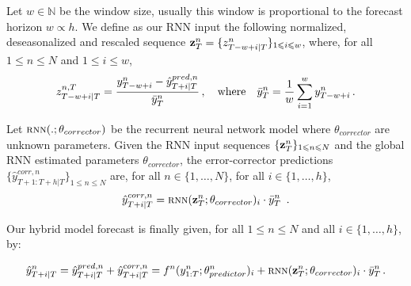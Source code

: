 \documentclass{article} %
\newcommand{\ts}{y}
\newcommand{\tspred}{\hat{\ts}}
\newcommand{\stat}{f}
\newcommand{\statparam}{\theta_{predictor}}
\newcommand{\lag}{h}
\newcommand{\window}{w}
\newcommand{\meants}{\Bar{\ts}}
\newcommand{\rnnwindow}{{\bf \rnninput}}
\newcommand{\rnninput}{z}
\newcommand{\rnn}{\textsc{rnn}}
\newcommand{\rnnparam}{\theta_{corrector}}
\begin{document}

Let $\window \in \mathbb{N}$ be the window size, usually this window is proportional to the forecast horizon $\window \propto \lag$. We define as our RNN input the following  normalized, deseasonalized and rescaled sequence $\rnnwindow^n_T = \{\rnninput^{n}_{T-\window+i|T}\}_{1\leqslant i \leqslant w}$, where, for all $1\leqslant n \leqslant N$ and $1\leqslant i \leqslant w$, 
$$
\rnninput^{n,T}_{T-w+i|T} = \frac{\ts^n_{T-w+i} -\tspred^{pred,n}_{T+i|T}}{\meants^n_T}\,,\quad\mbox{where}\quad \meants^n_T = \frac{1}{w}\sum_{i = 1}^{w}\ts^n_{T-w+i}\,.
$$


Let $\rnn(.;\rnnparam)$ be the recurrent neural network model where $\rnnparam$ are  unknown parameters. Given the RNN input sequences $\{\rnnwindow^n_T\}_{1\leqslant n \leqslant N}$ and the global RNN estimated parameters $\rnnparam$, the error-corrector predictions $\{\tspred^{corr,n}_{T+1:T+\lag|T}\}_{1\leqslant n \leqslant N}$ are, for all $n \in \{1,\ldots,N\}$, for all $i \in \{1,\ldots,\lag\}$,
$$
\tspred^{corr,n}_{T+i|T} = \rnn(\rnnwindow^n_T;\rnnparam)_i \cdot \meants^n_T\ \,.
$$

Our hybrid model forecast is finally given, for all $1\leqslant n \leqslant N$ and all $i \in \{1,\ldots,\lag\}$, by:

\begin{equation}
\label{eq:nows:full:model}
\tspred^n_{T+i|T}  = \tspred^{pred,n}_{T+i|T} +  \tspred^{corr,n}_{T+i|T} = \stat^n(\ts^n_{1:T};\statparam^n)_i +  \rnn(\rnnwindow^n_T;\rnnparam)_i \cdot \meants^n_T\,.
\end{equation}
\end{document}
